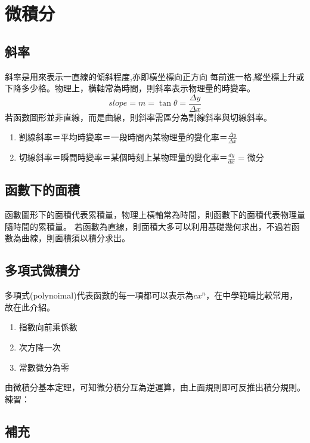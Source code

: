 \documentclass[cn,10pt,math=newtx,chinesefont=founder]{elegantbook}
\begin{document}
\chapter{微積分}
\section{斜率}
 斜率是用來表示一直線的傾斜程度,亦即橫坐標向正方向
 每前進一格,縱坐標上升或下降多少格。物理上，橫軸常為時間，則斜率表示物理量的時變率。
\begin{equation}
    slope =  m  = \tan \theta = \frac{\Delta y}{\Delta x}
\end{equation}
若函數圖形並非直線，而是曲線，則斜率需區分為割線斜率與切線斜率。
\begin{enumerate}
    \itemsep = 2em
    \item 割線斜率＝平均時變率＝一段時間內某物理量的變化率＝$\frac{\Delta y}{\Delta x}$
    \item 切線斜率＝瞬間時變率＝某個時刻上某物理量的變化率＝$\frac{dy}{dx}$ = 微分
\end{enumerate}
\section{函數下的面積}
 函數圖形下的面積代表累積量，物理上橫軸常為時間，則函數下的面積代表物理量隨時間的累積量。
 若函數為直線，則面積大多可以利用基礎幾何求出，不過若函數為曲線，則面積須以積分求出。
\section{多項式微積分}
多項式(polynoimal)代表函數的每一項都可以表示為$cx^n$，在中學範疇比較常用，故在此介紹。
\begin{enumerate}
    \item 指數向前乘係數
    \item 次方降一次
    \item 常數微分為零
\end{enumerate}
由微積分基本定理，可知微分積分互為逆運算，由上面規則即可反推出積分規則。\\
練習：
\newpage
\section{補充}
\newpage
\end{document}
